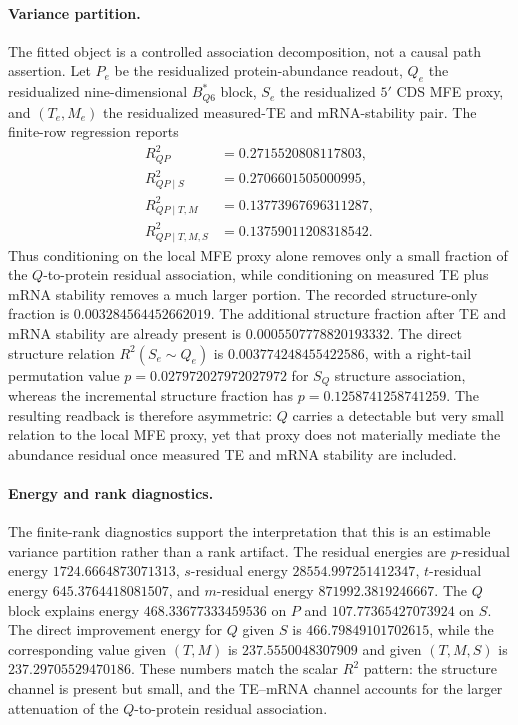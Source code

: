 \paragraph{Variance partition.}
The fitted object is a controlled association decomposition, not a causal path assertion.  Let $P_e$ be the residualized protein-abundance readout, $Q_e$ the residualized nine-dimensional $B^*_{Q6}$ block, $S_e$ the residualized $5'$ CDS MFE proxy, and $(T_e,M_e)$ the residualized measured-TE and mRNA-stability pair.  The finite-row regression reports
$$\begin{aligned}
R^2_{QP} &= 0.2715520808117803,\\
R^2_{QP\mid S} &= 0.2706601505000995,\\
R^2_{QP\mid T,M} &= 0.13773967696311287,\\
R^2_{QP\mid T,M,S} &= 0.13759011208318542.
\end{aligned}$$
Thus conditioning on the local MFE proxy alone removes only a small fraction of the $Q$-to-protein residual association, while conditioning on measured TE plus mRNA stability removes a much larger portion.  The recorded structure-only fraction is $0.003284564452662019$.  The additional structure fraction after TE and mRNA stability are already present is $0.0005507778820193332$.  The direct structure relation $R^2(S_e\sim Q_e)$ is $0.003774248455422586$, with a right-tail permutation value $p=0.027972027972027972$ for $S_Q$ structure association, whereas the incremental structure fraction has $p=0.1258741258741259$.  The resulting readback is therefore asymmetric: $Q$ carries a detectable but very small relation to the local MFE proxy, yet that proxy does not materially mediate the abundance residual once measured TE and mRNA stability are included.

\paragraph{Energy and rank diagnostics.}
The finite-rank diagnostics support the interpretation that this is an estimable variance partition rather than a rank artifact.  The residual energies are $p$-residual energy $1724.6664873071313$, $s$-residual energy $28554.997251412347$, $t$-residual energy $645.3764418081507$, and $m$-residual energy $871992.3819246667$.  The $Q$ block explains energy $468.33677333459536$ on $P$ and $107.77365427073924$ on $S$.  The direct improvement energy for $Q$ given $S$ is $466.79849101702615$, while the corresponding value given $(T,M)$ is $237.5550048307909$ and given $(T,M,S)$ is $237.29705529470186$.  These numbers match the scalar $R^2$ pattern: the structure channel is present but small, and the TE--mRNA channel accounts for the larger attenuation of the $Q$-to-protein residual association.

